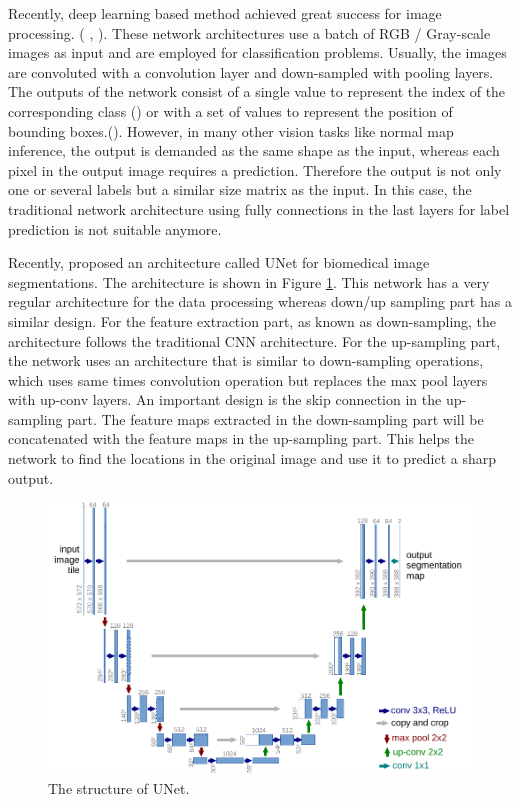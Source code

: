Recently, deep learning based method achieved great success for image processing. ( \cite{yolov3}, \cite{efficientDet}). These network architectures use a batch of RGB / Gray-scale images as input and are employed for classification problems. Usually, the images are convoluted with a convolution layer and down-sampled with pooling layers. The outputs of the network consist of a single value to represent the index of the corresponding class (\cite{efficientDet}) or with a set of values to represent the position of bounding boxes.(\cite{yolov3}). However, in many other vision tasks like normal map inference, the output is demanded as the same shape as the input, whereas each pixel in the output image requires a prediction. Therefore the output is not only one or several labels but a similar size matrix as the input. In this case, the traditional network architecture using fully connections in the last layers for label prediction is not suitable anymore.

Recently, \cite{unet} proposed an architecture called UNet for biomedical image segmentations. The architecture is shown in Figure \ref{fig:u-net}. This network has a very regular architecture for the data processing whereas down/up sampling part has a similar design. For the feature extraction part, as known as down-sampling, the architecture follows the traditional CNN architecture. For the up-sampling part, the network uses an architecture that is similar to down-sampling operations, which uses same times convolution operation but replaces the max pool layers with up-conv layers. An important design is the skip connection in the up-sampling part. The feature maps extracted in the down-sampling part will be concatenated with the feature maps in the up-sampling part. This helps the network to find the locations in the original image and use it to predict a sharp output.

\begin{figure}[th]
	\centering
	\includegraphics[width=.8\textwidth]{./Figures/u-net-illustration-correct-scale2.pdf}
	\decoRule
	\caption{The structure of UNet. \cite{unet}}
	\label{fig:u-net}
\end{figure}

